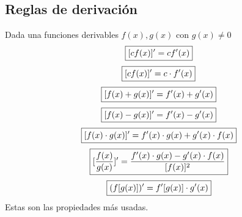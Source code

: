 \documentclass[10pt,twoside]{SelfArx} %
\begin{document}
\subsection{Reglas de derivaci\'on}




{\fboxsep 8pt\fboxrule 1pt \label{propiedades_derivadas}
Dada una funciones derivables $ f(x), g(x) $ con $ g(x)\neq0 $
\[ \fbox{$\displaystyle[cf(x)]'=cf'(x)$} \]
\[ \fbox{$\displaystyle[cf(x)]'=c\cdot f'(x)$} \]
\[ \fbox{$\displaystyle[f(x)+g(x)]'=f'(x)+g'(x)$} \]
\[ \fbox{$\displaystyle[f(x)-g(x)]'=f'(x)-g'(x)$} \]
\[ \fbox{$\displaystyle[f(x)\cdot g(x)]'=f'(x)\cdot g(x)+g'(x)\cdot f(x)$} \]
\[ \fbox{$\displaystyle[\frac{f(x)}{g(x)}]'=\frac{f'(x)\cdot g(x)-g'(x)\cdot f(x)}{[f(x)]^{2}}$} \]
\[ \fbox{$\displaystyle(f[g(x)])'=f'[g(x)] \cdot g'(x)$} \]}
Estas son las propiedades m\'as usadas.
\end{document}
